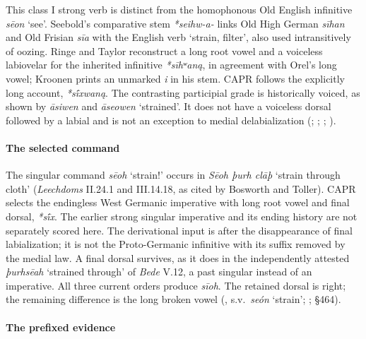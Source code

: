 \documentclass[
  british,
  a4paper,
]{article}
\begin{document}
This class I strong verb is distinct from the homophonous Old English
infinitive \emph{sēon} `see'. Seebold's comparative stem
\emph{*seihw-a-} links Old High German \emph{sīhan} and Old Frisian
\emph{sīa} with the English verb `strain, filter', also used
intransitively of oozing. Ringe and Taylor reconstruct a long root vowel
and a voiceless labiovelar for the inherited infinitive \emph{*sīhʷaną},
in agreement with Orel's long vowel; Kroonen prints an unmarked \emph{i}
in his stem. CAPR follows the explicitly long account, \emph{*sī́xwaną}.
The contrasting participial grade is historically voiced, as shown by
\emph{āsiwen} and \emph{āseowen} `strained'. It does not have a
voiceless dorsal followed by a labial and is not an exception to medial
delabialization (;
;
;
).

\paragraph{The selected command}\label{the-selected-command}

The singular command {\emph{sēoh}} `strain!' occurs in \emph{Sēoh þurh
clāþ} `strain through cloth' (\emph{Leechdoms} II.24.1 and III.14.18, as
cited by Bosworth and Toller). CAPR selects the endingless West Germanic
imperative with long root vowel and final dorsal, \emph{*sī́x}. The
earlier strong singular imperative and its ending history are not
separately scored here. The derivational input is after the
disappearance of final labialization; it is not the Proto-Germanic
infinitive with its suffix removed by the medial law. A final dorsal
survives, as it does in the independently attested \emph{þurhsēah}
`strained through' of \emph{Bede} V.12, a past singular instead of an
imperative. All three current orders produce \emph{sīoh}. The retained
dorsal is right; the remaining difference is the long broken vowel
(,
s.v.~\emph{seón} `strain'; ;  §464).

\paragraph{The prefixed evidence}\label{the-prefixed-evidence}
\end{document}

